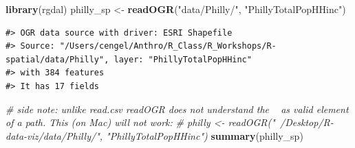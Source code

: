 \documentclass[]{book}
\newenvironment{Shaded}{\begin{snugshade}}{\end{snugshade}}
\newcommand{\KeywordTok}[1]{\textcolor[rgb]{0.13,0.29,0.53}{\textbf{#1}}}
\newcommand{\StringTok}[1]{\textcolor[rgb]{0.31,0.60,0.02}{#1}}
\newcommand{\CommentTok}[1]{\textcolor[rgb]{0.56,0.35,0.01}{\textit{#1}}}
\newcommand{\NormalTok}[1]{#1}
\theoremstyle{definition}
\theoremstyle{definition}
\theoremstyle{definition}
\theoremstyle{remark}
\begin{document}
\begin{Shaded}
\begin{Highlighting}[]
\KeywordTok{library}\NormalTok{(rgdal)}
\NormalTok{philly_sp <-}\StringTok{ }\KeywordTok{readOGR}\NormalTok{(}\StringTok{"data/Philly/"}\NormalTok{, }\StringTok{"PhillyTotalPopHHinc"}\NormalTok{) }
\end{Highlighting}
\end{Shaded}

\begin{verbatim}
#> OGR data source with driver: ESRI Shapefile 
#> Source: "/Users/cengel/Anthro/R_Class/R_Workshops/R-spatial/data/Philly", layer: "PhillyTotalPopHHinc"
#> with 384 features
#> It has 17 fields
\end{verbatim}

\begin{Shaded}
\begin{Highlighting}[]
\CommentTok{# side note: unlike read.csv readOGR does not understand the ~ as valid element of a path. This (on Mac) will not work:}
\CommentTok{# philly <- readOGR("~/Desktop/R-data-viz/data/Philly/", "PhillyTotalPopHHinc")}
\KeywordTok{summary}\NormalTok{(philly_sp)}
\end{Highlighting}
\end{Shaded}
\end{document}
